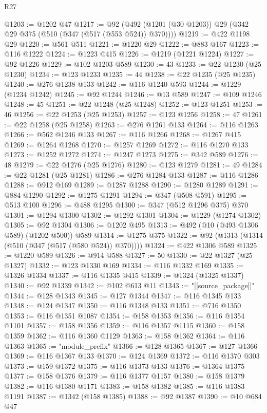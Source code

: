 \begin{lexlean}{R27}
\begin{coremodule}
@1203 := @1202 @47
@1217 := @92 (@492 (@1201 (@30 @1203)) @29 (@342 @29 @375 (@510 (@347 (@517 (@553 @524)) @370))))
@1219 := @422 @1198 @29
@1220 := @561 @511
@1221 := @1220 @29
@1222 := @883 @167
@1223 := @116 @1222
@1224 := @1223 @415
@1226 := @1219 (@1221 @1224)
@1227 := @92 @1226
@1229 := @102 @1203 @589
@1230 := 43
@1233 := @22 @1230 (@25 @1230)
@1234 := @123 @1233
@1235 := 44
@1238 := @22 @1235 (@25 @1235)
@1240 := @276 @1238 @133
@1242 := @116 @1240 @593
@1244 := @1229 (@1234 @1242)
@1245 := @92 @1244
@1246 := @13 @589
@1247 := @109 @1246
@1248 := 45
@1251 := @22 @1248 (@25 @1248)
@1252 := @123 @1251
@1253 := 46
@1256 := @22 @1253 (@25 @1253)
@1257 := @123 @1256
@1258 := 47
@1261 := @22 @1258 (@25 @1258)
@1263 := @276 @1261 @133
@1264 := @116 @1263
@1266 := @562 @1246 @133
@1267 := @116 @1266
@1268 := @1267 @415
@1269 := @1264 @1268
@1270 := @1257 @1269
@1272 := @116 @1270 @133
@1273 := @1252 @1272
@1274 := @1247 @1273
@1275 := @342 @589
@1276 := 48
@1279 := @22 @1276 (@25 @1276)
@1280 := @123 @1279
@1281 := 49
@1284 := @22 @1281 (@25 @1281)
@1286 := @276 @1284 @133
@1287 := @116 @1286
@1288 := @912 @169
@1289 := @1287 @1288
@1290 := @1280 @1289
@1291 := @884 @1290
@1292 := @1275 @1291
@1294 := @347 (@508 @591)
@1295 := @513 @100
@1296 := @488 @1295
@1300 := @347 (@512 @1296 @375) @370
@1301 := @1294 @1300
@1302 := @1292 @1301
@1304 := @1229 (@1274 @1302)
@1305 := @92 @1304
@1306 := @1202 @495
@1313 := @492 (@10 (@493 @1306 @589) (@1202 @500)) @589
@1314 := @1275 @375
@1322 := @92 (@1313 (@1314 (@510 (@347 (@517 (@580 @524)) @370))))
@1324 := @422 @1306 @589
@1325 := @1220 @589
@1326 := @914 @588
@1327 := 50
@1330 := @22 @1327 (@25 @1327)
@1332 := @123 @1330 @169
@1334 := @116 @1332 @169
@1335 := @1326 @1334
@1337 := @116 @1335 @415
@1339 := @1324 (@1325 @1337)
@1340 := @92 @1339
@1342 := @102 @613 @11
@1343 := "[[source_package]]"
@1344 := @128 @1343
@1345 := @127 @1344
@1347 := @116 @1345 @133
@1348 := @124 @1347
@1350 := @116 @1348 @133
@1351 := @716 @1350
@1353 := @116 @1351 @1087
@1354 := @158 @1353
@1356 := @116 @1354 @1101
@1357 := @158 @1356
@1359 := @116 @1357 @1115
@1360 := @158 @1359
@1362 := @116 @1360 @1129
@1363 := @158 @1362
@1364 := @116 @1363
@1365 := "module_prefix"
@1366 := @128 @1365
@1367 := @127 @1366
@1369 := @116 @1367 @133
@1370 := @124 @1369
@1372 := @116 @1370 @303
@1373 := @159 @1372
@1375 := @116 @1373 @133
@1376 := @1364 @1375
@1377 := @158 @1376
@1379 := @116 @1377 @1157
@1380 := @158 @1379
@1382 := @116 @1380 @1171
@1383 := @158 @1382
@1385 := @116 @1383 @1191
@1387 := @1342 (@158 @1385)
@1388 := @92 @1387
@1390 := @10 @684 @47

\end{coremodule}
\end{lexlean}

